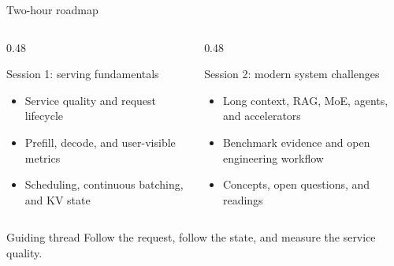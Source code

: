 \documentclass[aspectratio=169,11pt]{beamer}
\begin{document}
\begin{frame}{Two-hour roadmap}
  \begin{columns}[T,totalwidth=\textwidth]
    \begin{column}{0.48\textwidth}
      \begin{block}{Session 1: serving fundamentals}
        \begin{itemize}
          \item Service quality and request lifecycle
          \item Prefill, decode, and user-visible metrics
          \item Scheduling, continuous batching, and KV state
        \end{itemize}
      \end{block}
    \end{column}
    \begin{column}{0.48\textwidth}
      \begin{block}{Session 2: modern system challenges}
        \begin{itemize}
          \item Long context, RAG, MoE, agents, and accelerators
          \item Benchmark evidence and open engineering workflow
          \item Concepts, open questions, and readings
        \end{itemize}
      \end{block}
    \end{column}
  \end{columns}
  \vspace{0.30cm}
  \begin{block}{Guiding thread}
    Follow the request, follow the state, and measure the service quality.
  \end{block}
\end{frame}
\end{document}
